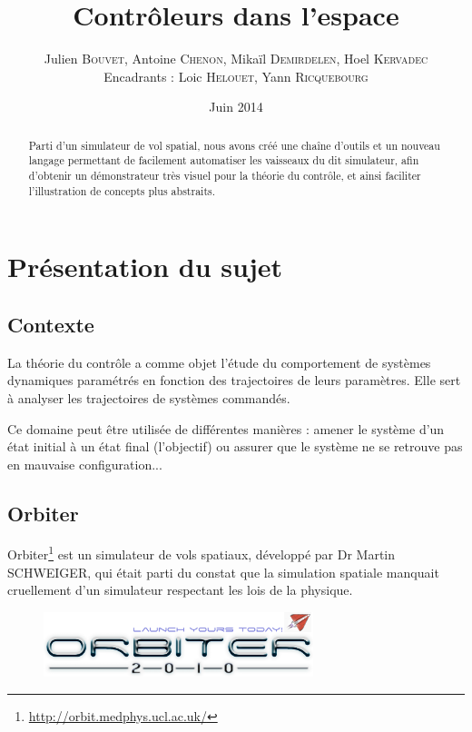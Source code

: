 \documentclass[a4paper,11pt]{article}
\title{\textbf{Contrôleurs dans l'espace}}
\author{Julien \textsc{Bouvet}, Antoine \textsc{Chenon}, Mikaïl \textsc{Demirdelen}, Hoel \textsc{Kervadec}
        \\
        Encadrants : Loic \textsc{Helouet}, Yann \textsc{Ricquebourg}}
\date{Juin 2014}
\begin{document}
\thispagestyle{empty}

\maketitle
\begin{abstract}
    Parti d'un simulateur de vol spatial, nous avons créé une chaîne d'outils et un nouveau langage permettant de facilement automatiser les vaisseaux du dit simulateur, afin d'obtenir un démonstrateur très visuel pour la théorie du contrôle, et ainsi faciliter l'illustration de concepts plus abstraits.
\end{abstract}



\section{Présentation du sujet}
    \subsection{Contexte}
        La théorie du contrôle a comme objet l'étude du comportement de systèmes dynamiques paramétrés en fonction des trajectoires de leurs paramètres. Elle sert à analyser les trajectoires de systèmes commandés.

        Ce domaine peut être utilisée de différentes manières : amener le système d'un état initial à un état final (l'objectif) ou assurer que le système ne se retrouve pas en mauvaise configuration...

    \subsection{Orbiter}
        Orbiter\footnote{\url{http://orbit.medphys.ucl.ac.uk/}} est un simulateur de vols spatiaux, développé par Dr Martin SCHWEIGER, qui était parti du constat que la simulation spatiale manquait cruellement d'un simulateur respectant les lois de la physique.

        \begin{figure}[!h]
            \begin{center}
                \includegraphics[width=0.7\textwidth]{img/orbiter_logo.png}
            \end{center}
        \end{figure}
\end{document}
